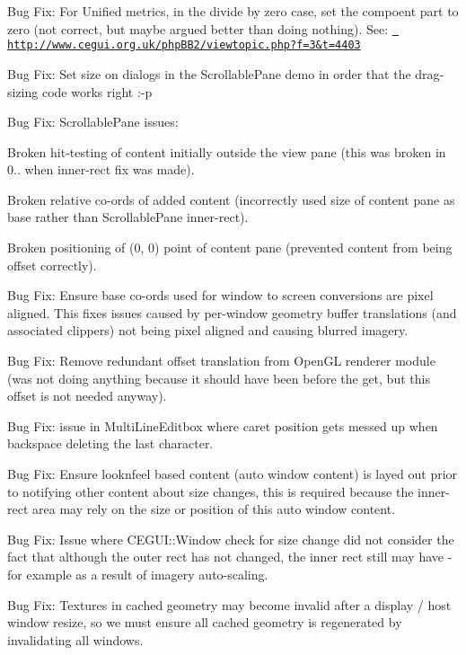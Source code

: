 \begin{DoxyItemize}
\item Bug Fix\+: For Unified metrics, in the divide by zero case, set the compoent part to zero (not correct, but maybe argued better than doing nothing). See\+: \href{http://www.cegui.org.uk/phpBB2/viewtopic.php?f=3&t=4403}{\texttt{ http\+://www.\+cegui.\+org.\+uk/php\+B\+B2/viewtopic.\+php?f=3\&t=4403}}
\item Bug Fix\+: Set size on dialogs in the Scrollable\+Pane demo in order that the drag-\/sizing code works right \+:-\/p
\item Bug Fix\+: Scrollable\+Pane issues\+:
\begin{DoxyItemize}
\item Broken hit-\/testing of content initially outside the view pane (this was broken in 0.. when inner-\/rect fix was made).
\item Broken relative co-\/ords of added content (incorrectly used size of content pane as base rather than Scrollable\+Pane inner-\/rect).
\item Broken positioning of (0, 0) point of content pane (prevented content from being offset correctly).
\end{DoxyItemize}
\item Bug Fix\+: Ensure base co-\/ords used for window to screen conversions are pixel aligned. This fixes issues caused by per-\/window geometry buffer translations (and associated clippers) not being pixel aligned and causing blurred imagery.
\item Bug Fix\+: Remove redundant offset translation from Open\+GL renderer module (was not doing anything because it should have been before the \textquotesingle{}get\textquotesingle{}, but this offset is not needed anyway).
\item Bug Fix\+: issue in Multi\+Line\+Editbox where caret position gets messed up when backspace deleting the last character.
\item Bug Fix\+: Ensure looknfeel based content (auto window content) is layed out prior to notifying other content about size changes, this is required because the inner-\/rect area may rely on the size or position of this auto window content.
\item Bug Fix\+: Issue where C\+E\+G\+U\+I\+::\+Window check for size change did not consider the fact that although the outer rect has not changed, the inner rect still may have -\/ for example as a result of imagery auto-\/scaling.
\item Bug Fix\+: Textures in cached geometry may become invalid after a display / host window resize, so we must ensure all cached geometry is regenerated by invalidating all windows.

\end{DoxyItemize}
